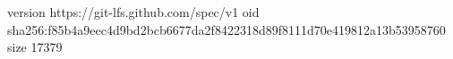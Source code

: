 version https://git-lfs.github.com/spec/v1
oid sha256:f85b4a9eec4d9bd2bcb6677da2f8422318d89f8111d70e419812a13b53958760
size 17379
